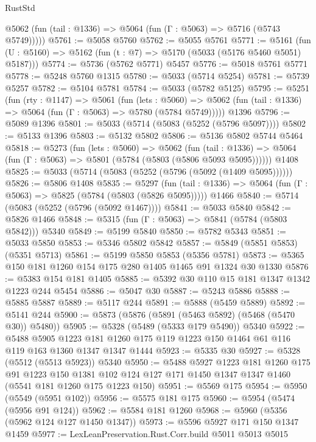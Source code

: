 \begin{lexlean}{RustStd}
\begin{coremodule}
{\begin{coremodule}
{{{{{{{{{{{{{{{{{{{{{{{{{{{{{{{{{{      @5062 (fun (tail : @1336) => @5064 (fun (Γ : @5063) => @5716 (@5743 @5749)))))
@5761 := @5058 @5760
@5762 := @5055 @5761
@5771 := @5161 (fun (U : @5160) => @5162 (fun (t : @7) => @5170 (@5033 (@5176 @5460 @5051) @5187)))
@5774 := @5736 (@5762 @5771) @5457
@5776 := @5018 @5761 @5771
@5778 := @5248 @5760 @1315
@5780 := @5033 (@5714 @5254)
@5781 := @5739 @5257
@5782 := @5104 @5781
@5784 := @5033 (@5782 @5125)
@5795 := @5251
    (fun (rty : @1147) =>
    @5061
      (fun (lets : @5060) =>
      @5062 (fun (tail : @1336) => @5064 (fun (Γ : @5063) => @5780 (@5784 @5749)))))
    @1396
@5796 := @5089 @1396
@5801 := @5033 (@5714 (@5083 (@5252 (@5796 @5097))))
@5802 := @5133 @1396
@5803 := @5132 @5802
@5806 := @5136 @5802 @5744 @5464
@5818 := @5273
    (fun (lets : @5060) =>
    @5062
      (fun (tail : @1336) => @5064 (fun (Γ : @5063) => @5801 (@5784 (@5803 (@5806 @5093 @5095))))))
    @1408
@5825 := @5033 (@5714 (@5083 (@5252 (@5796 (@5092 (@1409 @5095))))))
@5826 := @5806 @1408
@5835 := @5297
    (fun (tail : @1336) => @5064 (fun (Γ : @5063) => @5825 (@5784 (@5803 (@5826 @5095)))))
    @1466
@5840 := @5714 (@5083 (@5252 (@5796 (@5092 @1467))))
@5841 := @5033 @5840
@5842 := @5826 @1466
@5848 := @5315 (fun (Γ : @5063) => @5841 (@5784 (@5803 @5842))) @5340
@5849 := @5199 @5840
@5850 := @5782 @5343
@5851 := @5033 @5850
@5853 := @5346 @5802 @5842
@5857 := @5849 (@5851 @5853) (@5351 @5713)
@5861 := @5199 @5850 @5853 (@5356 @5781)
@5873 := @5365 @150 @181 @1260 @154 @175 @280 @1405 @1465 @91 @1324 @30 @1330
@5876 := @5383 @154 @181 @1405
@5885 := @5392 @30 @110 @15 @181 @1347 @1342 @1223 @244 @5454
@5886 := @5047 @30
@5887 := @5243 @5886
@5888 := @5885 @5887
@5889 := @5117 @244
@5891 := @5888 (@5459 @5889)
@5892 := @5141 @244
@5900 := @5873 (@5876 (@5891 (@5463 @5892) (@5468 (@5470 @30)) @5480))
@5905 := @5328 (@5489 (@5333 @179 @5490)) @5340
@5922 := @5488
    @5905
    @1223
    @181
    @1260
    @175
    @119
    @1223
    @150
    @1464
    @61
    @116
    @119
    @163
    @1360
    @1347
    @1347
    @1444
@5923 := @5335 @30
@5927 := @5328 (@5512 (@5513 @5923)) @5340
@5950 := @5488
    @5927
    @1223
    @181
    @1260
    @175
    @91
    @1223
    @150
    @1381
    @102
    @124
    @127
    @171
    @1450
    @1347
    @1347
    @1460
    (@5541 @181 @1260 @175 @1223 @150)
@5951 := @5569 @175
@5954 := @5950 (@5549 (@5951 @102))
@5956 := @5575 @181 @175
@5960 := @5954 (@5474 (@5956 @91 @124))
@5962 := @5584 @181 @1260
@5968 := @5960 (@5356 (@5962 @124 @127 @1450 @1347))
@5973 := @5596 @5927 @171 @150 @1347 @1459
@5977 := LexLeanPreservation.Rust.Corr.build @5011 @5013 @5015
}}}}}}}}}}}}}}}}}}}}}}}}}}}}}}}}}}
\end{coremodule}}
\end{coremodule}
\end{lexlean}
